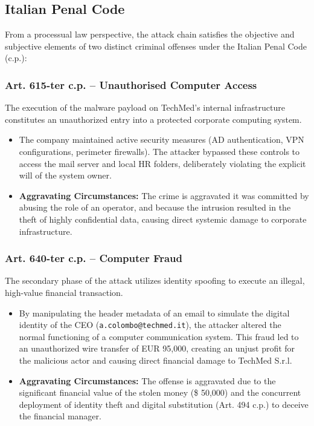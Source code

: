 \subsection{Italian Penal Code}
From a processual law perspective, the attack chain satisfies the objective and subjective elements of two distinct criminal offenses under the Italian Penal Code (c.p.):

\subsubsection*{Art. 615-ter c.p. -- Unauthorised Computer Access}
The execution of the malware payload on TechMed's internal infrastructure constitutes an unauthorized entry into a protected corporate computing system.
\begin{itemize}
    \item The company maintained active security measures (AD authentication, VPN configurations, perimeter firewalls). The attacker bypassed these controls to access the mail server and local HR folders, deliberately violating the explicit will of the system owner.
    \item \textbf{Aggravating Circumstances:} The crime is aggravated it was committed by abusing the role of an operator, and because the intrusion resulted in the theft of highly confidential data, causing direct systemic damage to corporate infrastructure.
\end{itemize}

\subsubsection*{Art. 640-ter c.p. -- Computer Fraud}
The secondary phase of the attack utilizes identity spoofing to execute an illegal, high-value financial transaction.
\begin{itemize}
    \item By manipulating the header metadata of an email to simulate the digital identity of the CEO (\texttt{a.colombo@techmed.it}), the attacker altered the normal functioning of a computer communication system. This fraud led to an unauthorized wire transfer of EUR 95,000, creating an unjust profit for the malicious actor and causing direct financial damage to TechMed S.r.l.
    \item \textbf{Aggravating Circumstances:} The offense is aggravated due to the significant financial value of the stolen money (\$ 50,000) and the concurrent deployment of identity theft and digital substitution (Art. 494 c.p.) to deceive the financial manager.
\end{itemize}



